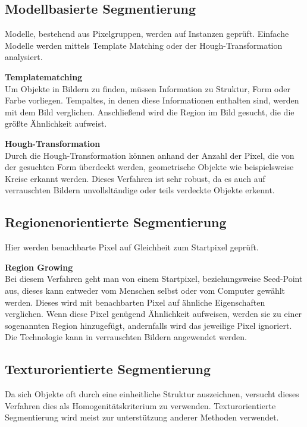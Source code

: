     \subsection*{Modellbasierte Segmentierung}
    Modelle\cite{Seg_modell}, bestehend aus Pixelgruppen, werden auf Instanzen geprüft. Einfache Modelle werden mittels Template Matching oder der Hough-Transformation analysiert. 

    \textbf{Templatematching}\\
    Um Objekte in Bildern zu finden, müssen Information zu Struktur, Form oder Farbe vorliegen. Tempaltes\cite{Seg_modell}, in denen diese Informationen enthalten sind, werden mit dem Bild verglichen. Anschließend wird die Region im Bild gesucht, die die größte Ähnlichkeit aufweist.

    \textbf{Hough-Transformation}\\
    Durch die Hough-Transformation\cite{Seg_modell} können anhand der Anzahl der Pixel, die von der gesuchten Form überdeckt werden, geometrische Objekte wie beispielsweise Kreise erkannt werden. Dieses Verfahren ist sehr robust, da es auch auf verrauschten Bildern unvollsltändige oder teils verdeckte Objekte erkennt.

    \subsection*{Regionenorientierte Segmentierung}
    Hier werden benachbarte Pixel\cite{Seg_region} auf Gleichheit zum Startpixel geprüft.

    \textbf{Region Growing}\\
    Bei diesem Verfahren geht man von einem Startpixel, beziehungsweise Seed-Point aus, dieses kann entweder vom Menschen selbst oder vom Computer gewählt werden. Dieses wird mit benachbarten Pixel auf ähnliche Eigenschaften verglichen. Wenn diese Pixel genügend Ähnlichkeit aufweisen, werden sie zu einer sogenannten Region hinzugefügt, andernfalls wird das jeweilige Pixel ignoriert. Die Technologie kann in verrauschten Bildern angewendet werden.

    \subsection*{Texturorientierte Segmentierung}
    Da sich Objekte oft durch eine einheitliche Struktur auszeichnen, versucht dieses Verfahren dies als Homogenitätskriterium zu verwenden. Texturorientierte Segmentierung\cite{Seg_textur} wird meist zur unterstützung anderer Methoden verwendet.

